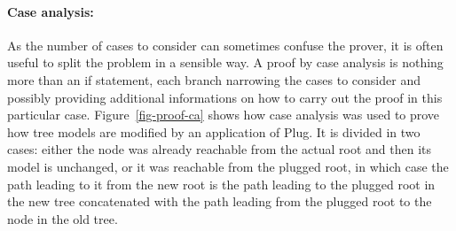 \documentclass[11pt,a4paper]{article}
\begin{document}
\paragraph{Case analysis:}
As the number of cases to consider can sometimes confuse the prover, it is often useful to split the
problem in a sensible way. A proof by case analysis is nothing more than an if statement, each branch
narrowing the cases to consider and possibly providing additional informations on how to carry out
the proof in this particular case. Figure~\ref{fig-proof-ca} shows how case analysis was used to
prove how tree models are modified by an application of Plug. It is divided in two cases: either
the node was already reachable from the actual root and then its model is unchanged, or it was reachable
from the plugged root, in which case the path leading to it from the new root is the path leading to
the plugged root in the new tree concatenated with the path leading from the plugged root to the node
in the old tree. 
\end{document}
